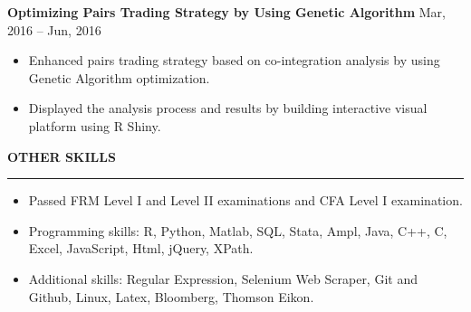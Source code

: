 \documentclass[a4paper,12pt]{report}
\newcommand{\marginAdj}{0.5in}
\begin{document}
\noindent 
\textbf{Optimizing Pairs Trading Strategy by Using Genetic Algorithm} \hspace*{0.95in}  \hspace*{\marginAdj} {\fontsize{10pt}{10pt}\selectfont  Mar, 2016 – Jun, 2016} \par
\noindent 
\begin{itemize}[noitemsep,topsep=0pt]
\item {\fontsize{10pt}{10pt}\selectfont Enhanced pairs trading strategy based on co-integration analysis by using Genetic Algorithm optimization.}
\item {\fontsize{10pt}{10pt}\selectfont Displayed the analysis process and results by building interactive visual platform using R Shiny.}
\end{itemize}
 \par
\vspace{9pt}





\noindent 
\textbf{OTHER SKILLS} \par
\vspace{2pt}
\hrule
\vspace{6pt}
\noindent 
\begin{itemize}[noitemsep,topsep=0pt]
\item {\fontsize{10pt}{10pt}\selectfont Passed FRM Level I and Level II examinations and CFA Level I examination.} \par
\noindent 
\item {\fontsize{10pt}{10pt}\selectfont Programming skills: R, Python, Matlab, SQL, Stata, Ampl, Java, C++, C, Excel, JavaScript, Html, jQuery, XPath. } \par
\noindent 
\item {\fontsize{10pt}{10pt}\selectfont Additional skills: Regular Expression, Selenium Web Scraper, Git and Github, Linux, Latex, Bloomberg, Thomson Eikon.}\end{itemize}
 \par
\end{document}

